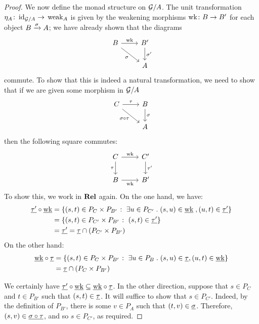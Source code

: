 \documentclass[11pt]{article} %
\begin{document}
\begin{theorem}
\begin{proof}
    We now define the monad structure on $\mathcal G/A$.  The unit transformation $\eta_A\colon{}\operatorname{id}_{\mathcal G/A}\to{}\operatorname{weak}_A$ is given by the weakening morphisms $\operatorname{wk}\colon{}B\to{}B'$ for each object $B\xrightarrow{\sigma} A$; we have already shown that the diagrams
    \[
      \begin{tikzcd}
        B \arrow[r, "\wk"] \arrow[dr, "\sigma"']
         & B' \arrow[d, "\sigma'"] \\
         & A
      \end{tikzcd}
      \]
    commute.  To show that this is indeed a natural transformation, we need to show that if we are given some morphism in $\mathcal G/A$
    \[
      \begin{tikzcd}
        C \arrow[r, "\tau"] \arrow[dr, "\comp\sigma\tau"']
          & B \arrow[d, "\sigma"] \\
          & A
      \end{tikzcd}
      \]
    then the following square commutes:
    \[
      \begin{tikzcd}
        C \arrow[r, "\wk"] \arrow[d, "\tau"']
          & C' \arrow[d, "\tau'"] \\
        B \arrow[r, "\wk"']
          & B'
      \end{tikzcd}
      \]
    To show this, we work in ${\normalfont\textbf{Rel}}$ again.  On the one hand, we have:
    \begin{align*}
      \underline{\tau'} \circ \underline{\operatorname{wk}} & = \{(s,t)\in P_C\times P_{B'}\;\colon\;\exists u\in P_{C'}\;.\; (s,u)\in\underline{\operatorname{wk}}\;,(u,t)\in\underline{\tau'}\} \\
       & = \{(s, t)\in P_{C'}\times P_{B'}\;\colon\; (s,t)\in\underline{\tau'}\} \\
       & = \underline{\tau'} = \underline{\tau}\cap(P_{C'}\times P_{B'})
    \end{align*}
    On the other hand:
    \begin{align*}
      \underline{\operatorname{wk}} \circ \underline{\tau} & = \{(s, t)\in P_C\times P_{B'}\;\colon\; \exists u\in P_B\;.\; (s,u)\in \underline{\tau}, (u, t)\in \underline{\operatorname{wk}}\} \\
       & = \underline{\tau} \cap (P_C\times P_{B'})
    \end{align*}
    
    We certainly have $\underline{\tau'} \circ \underline{\operatorname{wk}}\subseteq\underline{\operatorname{wk}} \circ \underline{\tau}$.  In the other direction, suppose that $s\in P_C$ and $t\in P_{B'}$ such that $(s,t)\in\underline{\tau}$.  It will suffice to show that $s\in P_{C'}$.  Indeed, by the definition of $P_{B'}$, there is some $v\in P_A$ such that $(t, v)\in\underline{\sigma}$.  Therefore, $(s, v)\in\underline{\sigma \circ \tau}$, and so $s\in P_{C'}$, as required.  


\end{proof}
\end{theorem}
\end{document}
